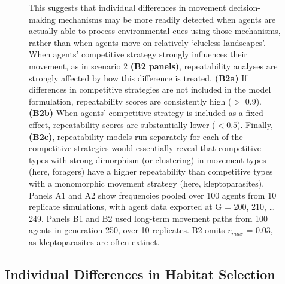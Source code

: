 \begin{figure}[h!]
{            This suggests that individual differences in movement decision-making mechanisms may be more readily detected when agents are actually able to process environmental cues using those mechanisms, rather than when agents move on relatively `clueless landscapes'.
            When agents' competitive strategy strongly influences their movement, as in scenario 2 \textbf{(B2 panels)}, repeatability analyses are strongly affected by how this difference is treated.
            \textbf{(B2a)} If differences in competitive strategies are not included in the model formulation, repeatability scores are consistently high ($>$ 0.9).
            \textbf{(B2b)} When agents' competitive strategy is included as a fixed effect, repeatability scores are substantially lower ($< 0.5$).
            Finally, \textbf{(B2c)}, repeatability models run separately for each of the competitive strategies would essentially reveal that competitive types with strong dimorphism (or clustering) in movement types (here, foragers) have a higher repeatability than competitive types with a monomorphic movement strategy (here, kleptoparasites).
            Panels A1 and A2 show frequencies pooled over 100 agents from 10 replicate simulations, with agent data exported at G = 200, 210, \ldots 249.
            Panels B1 and B2 used long-term movement paths from 100 agents in generation 250, over 10 replicates. B2 omits $r_{max}$ = 0.03, as kleptoparasites are often extinct.
        }
        \label{fig3}
    \end{figure}
    
    \subsection*{Individual Differences in Habitat Selection}
    
